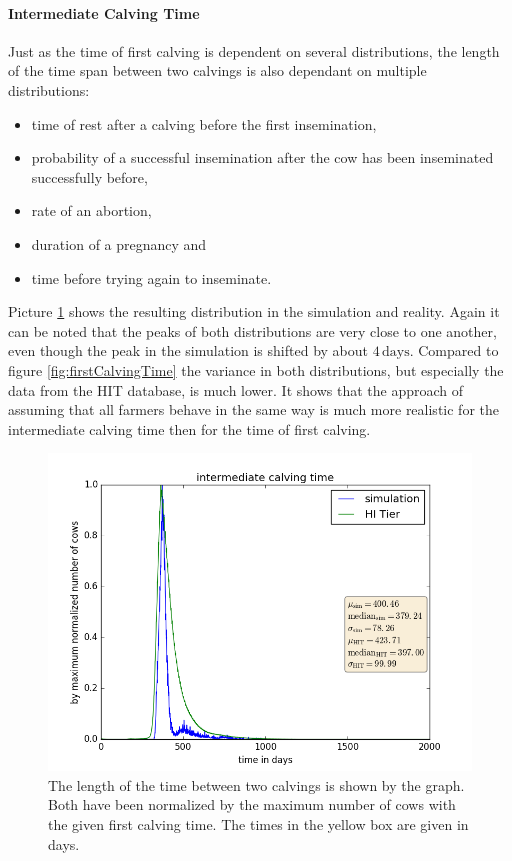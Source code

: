 \paragraph{Intermediate Calving Time}
Just as the time of first calving is dependent on several distributions, the length of the time span between two calvings is also dependant on multiple distributions:
\begin{itemize}
\item time of rest after a calving before the first insemination,
\item probability of a successful insemination after the cow has been inseminated successfully before,
\item rate of an abortion,
\item duration of a pregnancy and
\item time before trying again to inseminate.
\end{itemize}
Picture \ref{fig:intermediateCalvingTime} shows the resulting distribution in the simulation and reality. Again it can be noted that the peaks of both distributions are very close to one another, even though the peak in the simulation is shifted by about $4\,\text{days}$. Compared to figure \ref{fig:firstCalvingTime} the variance in both distributions, but especially the data from the HIT database, is much lower. It shows that the approach of assuming that all farmers behave in the same way is much more realistic for the intermediate calving time then for the time of first calving.
\begin{figure}[htbp]
\centering
\noindent\includegraphics[width=0.8\linewidth,height=\textheight,
keepaspectratio]{intermediateCalvingTimeswithCSV.png} 
\caption[Intermediate Calving Times]{The length of the time between two calvings is shown by the graph. Both have been normalized by the maximum number of cows with the given first calving time. The times in the yellow box are given in days.}
\label{fig:intermediateCalvingTime}
\end{figure}
